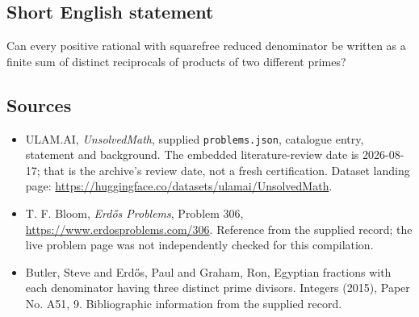 \documentclass[11pt,a4paper]{article}
\begin{document}
\subsection{Short English statement}

Can every positive rational with squarefree reduced denominator be written as a finite sum of distinct reciprocals of products of two different primes?

\subsection{Sources}

{\small

\begin{itemize}

\item[\hypertarget{source:statement:1}{S1}] ULAM.AI, \emph{UnsolvedMath}, supplied \texttt{problems.json}, catalogue entry, statement and background. The embedded literature-review date is 2026-08-17; that is the archive’s review date, not a fresh certification. Dataset landing page: \url{https://huggingface.co/datasets/ulamai/UnsolvedMath}.

\item[\hypertarget{source:statement:2}{S2}] T. F. Bloom, \emph{Erdős Problems}, Problem 306, \url{https://www.erdosproblems.com/306}. Reference from the supplied record; the live problem page was not independently checked for this compilation.

\item[\hypertarget{source:statement:3}{S3}] Butler, Steve and Erd\H{o}s, Paul and Graham, Ron, Egyptian fractions with each denominator having three distinct prime divisors. Integers (2015), Paper No. A51, 9. Bibliographic information from the supplied record.

\end{itemize}

}

\label{end:statement}
\end{document}

